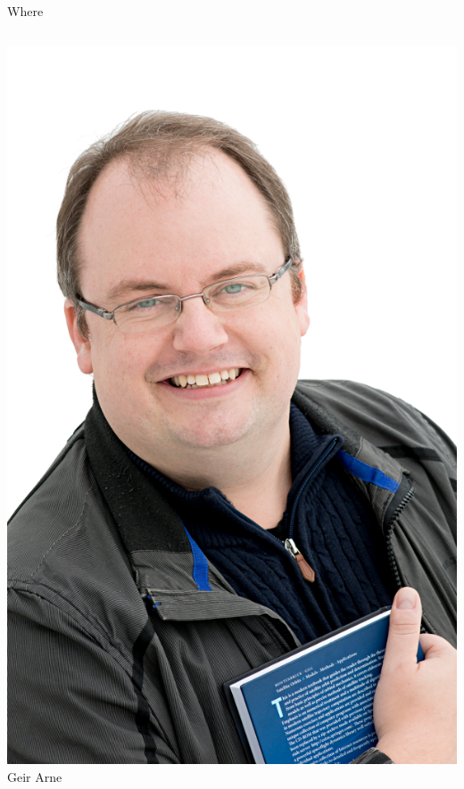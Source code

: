 \documentclass[12pt,table,t]{beamer}
\begin{document}
\begin{frame}{Where}
\begin{columns}[c]
    \begin{center}
      \includegraphics[width=\linewidth]{figure/geirarne} \\
      Geir Arne
    \end{center}


\end{columns}
\end{frame}
\end{document}
